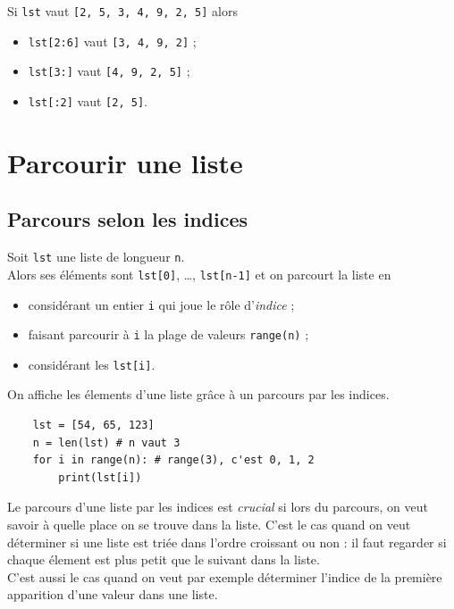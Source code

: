 \begin{exemple}[]
	Si \texttt{lst} vaut \texttt{[2, 5, 3, 4, 9, 2, 5]} alors
	\begin{itemize}
		\item \texttt{lst[2:6]} vaut \texttt{[3, 4, 9, 2]} ;
		\item \texttt{lst[3:]} vaut \texttt{[4, 9, 2, 5]} ;
		\item \texttt{lst[:2]} vaut \texttt{[2, 5]}.
	\end{itemize}
\end{exemple}




\section{Parcourir une liste}
\subsection{Parcours selon les indices}

\begin{definition}
	Soit \texttt{lst} une liste de longueur \texttt{n}.\\

	Alors ses éléments sont \texttt{lst[0]}, \ldots, \texttt{lst[n-1]} et on parcourt la liste en
	\begin{itemize}
		\item considérant un entier \texttt{i} qui joue le rôle d'\textit{indice} ;
		\item faisant parcourir à \texttt{i} la plage de valeurs \texttt{range(n)} ;
		\item considérant les \texttt{lst[i]}.
	\end{itemize}
\end{definition}
\begin{exemple}
	On affiche les élements d'une liste grâce à un parcours par les indices.
	\begin{verbatim}
	lst = [54, 65, 123]
	n = len(lst) # n vaut 3
	for i in range(n): # range(3), c'est 0, 1, 2
		print(lst[i])
	\end{verbatim}
\end{exemple}

Le parcours d'une liste par les indices est \textit{crucial} si lors du parcours, on veut savoir à quelle place on se trouve dans la liste. C'est le cas quand on veut déterminer si une liste est triée dans l'ordre croissant ou non : il faut regarder si chaque élement est plus petit que le suivant dans la liste.\\
C'est aussi le cas quand on veut par exemple déterminer l'indice de la première apparition d'une valeur dans une liste.



